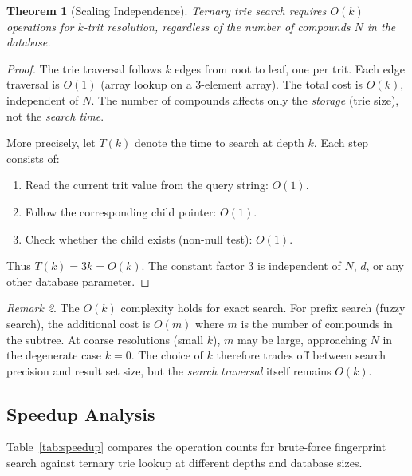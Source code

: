 \documentclass[11pt,a4paper]{article}
\newtheorem{theorem}{Theorem}[section]
\theoremstyle{definition}
\theoremstyle{remark}
\newtheorem{remark}[theorem]{Remark}
\begin{document}
\begin{theorem}[Scaling Independence]
\label{thm:scaling}
Ternary trie search requires $O(k)$ operations for $k$-trit resolution, regardless of the number of compounds $N$ in the database.
\end{theorem}

\begin{proof}
The trie traversal follows $k$ edges from root to leaf, one per trit. Each edge traversal is $O(1)$ (array lookup on a 3-element array). The total cost is $O(k)$, independent of $N$. The number of compounds affects only the \emph{storage} (trie size), not the \emph{search time}.

More precisely, let $T(k)$ denote the time to search at depth $k$. Each step consists of:
\begin{enumerate}[nosep]
\item Read the current trit value from the query string: $O(1)$.
\item Follow the corresponding child pointer: $O(1)$.
\item Check whether the child exists (non-null test): $O(1)$.
\end{enumerate}
Thus $T(k) = 3k = O(k)$. The constant factor 3 is independent of $N$, $d$, or any other database parameter.
\end{proof}

\begin{remark}
The $O(k)$ complexity holds for exact search. For prefix search (fuzzy search), the additional cost is $O(m)$ where $m$ is the number of compounds in the subtree. At coarse resolutions (small $k$), $m$ may be large, approaching $N$ in the degenerate case $k = 0$. The choice of $k$ therefore trades off between search precision and result set size, but the \emph{search traversal} itself remains $O(k)$.
\end{remark}

\subsection{Speedup Analysis}

Table~\ref{tab:speedup} compares the operation counts for brute-force fingerprint search against ternary trie lookup at different depths and database sizes.
\end{document}
